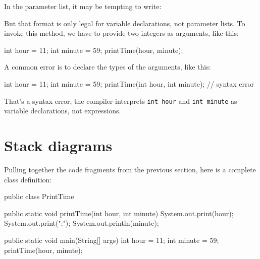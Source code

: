 \documentclass[12pt]{book}
\theoremstyle{exercise}
\newcommand{\java}[1]{\verb"#1"}
\begin{document}
In the parameter list, it may be tempting to write:

\begin{code}
    public static void printTime(int hour, minute) {
        ...
\end{code}

But that format is only legal for variable declarations, not parameter lists.
To invoke this method, we have to provide two integers as arguments, like this:

\begin{code}
    int hour = 11;
    int minute = 59;
    printTime(hour, minute);
\end{code}

A common error is to declare the types of the arguments, like this:

\begin{code}
    int hour = 11;
    int minute = 59;
    printTime(int hour, int minute);  // syntax error
\end{code}

That's a syntax error, the compiler interprets \java{int hour} and \java{int minute} as variable declarations, not expressions.




\section{Stack diagrams}
\label{stack}


Pulling together the code fragments from the previous section, here is a complete class definition:

\begin{code}
public class PrintTime {

    public static void printTime(int hour, int minute) {
        System.out.print(hour);
        System.out.print(":");
        System.out.println(minute);
    }

    public static void main(String[] args) {
        int hour = 11;
        int minute = 59;
        printTime(hour, minute);
    }
}
\end{code}
\end{document}
